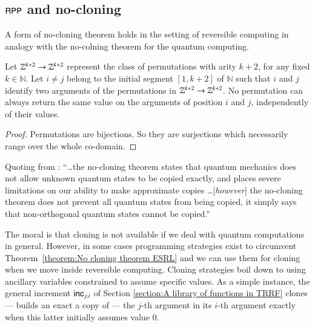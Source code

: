 \subsection{$ \mathsf{RPP}$ and no-cloning}
A form of no-cloning theorem holds in the setting of reversible computing in analogy with the no-colning theorem for the quantum computing.

\begin{theorem}
\label{theorem:No cloning theorem ESRL}
Let $\mathbb{Z}^{k+2}\rightarrow \mathbb{Z}^{k+2}$ represent the class of permutations with arity $ k+2 $, for any fixed 
$k\in \mathbb N$. 
Let $i \neq j$ belong to the initial segment $[1,k+2]$ of $ \mathbb N $ such that
$ i $ and $ j $ identify two arguments of the permutations in $\mathbb{Z}^{k+2}\rightarrow \mathbb{Z}^{k+2}$.
No permutation can always return the same value on the arguments of position $i$ and $j$,  
independently of their values.
\end{theorem}
\begin{proof}
Permutations are bijections. So they are surjections which necessarily range over the whole co-domain.
\end{proof}
\noindent
Quoting from \cite[p.530]{nielsen2011book}:
``\ldots the no-cloning theorem states that quantum mechanics does not allow unknown quantum states to be copied exactly, and places severe
limitations on our ability to make approximate copies \dots [\textit{however}] the no-cloning
theorem does not prevent all quantum states from being copied, it simply says that non-orthogonal quantum states cannot be copied.''

The moral is that cloning is not available if we deal with quantum computations in general.
However, in some cases programming strategies exist to circumvent Theorem~\ref{theorem:No cloning theorem ESRL}
and we can use them for cloning when we move inside reversible computing.
Cloning strategies boil down to using ancillary variables constrained to assume specific values.
As a simple instance, the general increment $ \mathsf{inc}_{j;i} $ of Section \ref{section:A library of functions in TRRF}
clones --- builds an exact a copy of --- the $ j $-th argument in its $ i $-th argument exactly when 
this latter initially assumes value 0.

